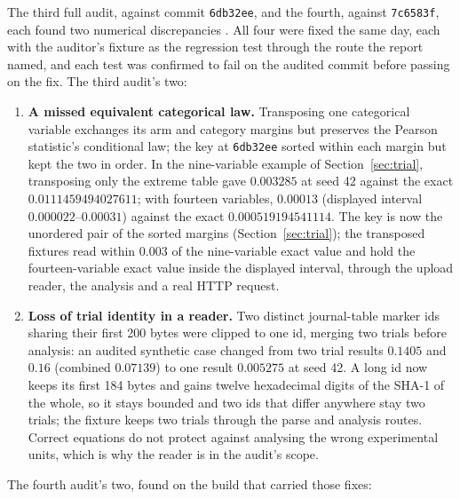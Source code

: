 \documentclass[11pt,a4paper]{article}
\begin{document}
The third full audit, against commit \texttt{6db32ee}, and the fourth, against \texttt{7c6583f}, each found two numerical discrepancies \citep{audit2026full,audit2026full2}. All four were fixed the same day, each with the auditor's fixture as the regression test through the route the report named, and each test was confirmed to fail on the audited commit before passing on the fix. The third audit's two:
\begin{enumerate}
\item \textbf{A missed equivalent categorical law.} Transposing one categorical variable exchanges its arm and category margins but preserves the Pearson statistic's conditional law; the key at \texttt{6db32ee} sorted within each margin but kept the two in order. In the nine-variable example of Section~\ref{sec:trial}, transposing only the extreme table gave $0.003285$ at seed 42 against the exact $0.0111459494027611$; with fourteen variables, $0.00013$ (displayed interval $0.000022$--$0.00031$) against the exact $0.000519194541114$. The key is now the unordered pair of the sorted margins (Section~\ref{sec:trial}); the transposed fixtures read within $0.003$ of the nine-variable exact value and hold the fourteen-variable exact value inside the displayed interval, through the upload reader, the analysis and a real HTTP request.
\item \textbf{Loss of trial identity in a reader.} Two distinct journal-table marker ids sharing their first 200 bytes were clipped to one id, merging two trials before analysis: an audited synthetic case changed from two trial results $0.1405$ and $0.16$ (combined $0.07139$) to one result $0.005275$ at seed 42. A long id now keeps its first 184 bytes and gains twelve hexadecimal digits of the SHA-1 of the whole, so it stays bounded and two ids that differ anywhere stay two trials; the fixture keeps two trials through the parse and analysis routes. Correct equations do not protect against analysing the wrong experimental units, which is why the reader is in the audit's scope.
\end{enumerate}
The fourth audit's two, found on the build that carried those fixes:
\end{document}
